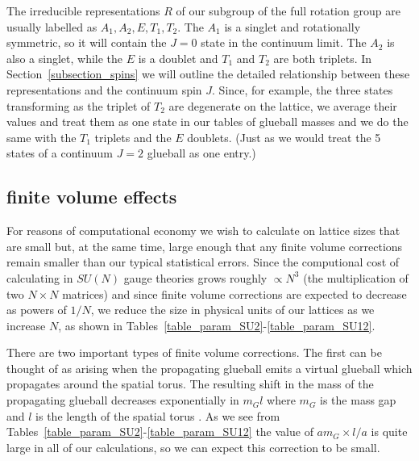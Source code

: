 \documentclass[12pt]{article}
\begin{document}
The irreducible representations $R$ of our subgroup of the full rotation group are usually
labelled as $A_1,A_2,E,T_1,T_2$. The $A_1$ is a singlet and rotationally symmetric, so it
will contain the $J=0$ state in the continuum limit. The $A_2$ is also a singlet, while the
$E$ is a doublet and $T_1$ and $T_2$ are both triplets. In Section~\ref{subsection_spins} we
will outline the detailed relationship between these representations and the continuum spin $J$.
Since, for example, the three states transforming as the triplet of $T_2$ are degenerate on
the lattice, we average their values and treat them as one state in our tables of glueball
masses and we do the same with the $T_1$ triplets and the $E$ doublets. (Just as we would
treat the 5 states of a continuum $J=2$ glueball as one entry.)

%
%
\subsection{finite volume effects}
\label{subsection_massV} 

For reasons of computational economy we wish to calculate on lattice sizes that are small 
but, at the same time, large enough that any finite volume corrections remain smaller than
our typical statistical errors. Since the computional cost of calculating in $SU(N)$
gauge theories grows roughly $\propto N^3$ (the multiplication of two $N \times N$
matrices) and since finite volume corrections are expected to decrease as powers of $1/N$,
we reduce the size in physical units of our lattices as we increase $N$, as shown
in Tables~\ref{table_param_SU2}-\ref{table_param_SU12}. 

There are two important types of finite volume corrections. The first can be thought of as arising
when the propagating glueball emits a virtual glueball which propagates around the spatial
torus. The resulting shift in the mass of the propagating glueball decreases exponentially
in $m_Gl$ where $m_G$ is the mass gap and $l$ is the length of the spatial torus
%
\cite{Luscher-V}.
%
As we see from Tables~\ref{table_param_SU2}-\ref{table_param_SU12} the value of $am_G \times l/a$
is quite large in all of our calculations, so we can expect this correction to be small.
\end{document}
